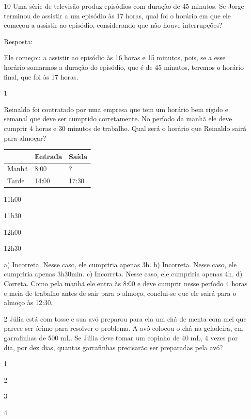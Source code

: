 \begin{escolha}
\num{10} Uma série de televisão produz episódios com duração de 45 minutos.
Se Jorge terminou de assistir a um episódio às 17 horas, qual foi o
horário em que ele começou a assistir ao episódio, considerando que não houve interrupções?


Resposta:

Ele começou a assistir ao episódio às 16 horas e 15 minutos, pois, se a esse
horário somarmos a duração do episódio, que é de 45 minutos, teremos o
horário final, que foi às 17 horas.


\num{1}

Reinaldo foi contratado por uma empresa que tem um horário bem rígido
e semanal que deve ser cumprido corretamente. No período da manhã ele deve
cumprir 4 horas e 30 minutos de trabalho. Qual será o horário que
Reinaldo sairá para almoçar?

\begin{longtable}[]{@{}lll@{}}
\toprule
& Entrada & Saída\tabularnewline
\midrule
\endhead
Manhã & 8:00 & ?\tabularnewline
Tarde & 14:00 & 17:30\tabularnewline
\bottomrule
\end{longtable}

\begin{escolha}
\item
  11h00
\item
  11h30
\item
  12h00
\item
  12h30
\end{escolha}

a) Incorreta. Nesse caso, ele cumpriria apenas 3h.
b) Incorreta. Nesse caso, ele cumpriria apenas 3h30min.
c) Incorreta. Nesse caso, ele cumpriria apenas 4h.
d) Correta. Como pela manhã ele entra às 8:00 e deve cumprir nesse período 4 horas e
meia de trabalho antes de sair para o almoço, conclui-se que ele sairá para o almoço às 12:30.

\num{2} Júlia está com tosse e sua avó preparou para ela um chá de menta com mel que parece ser órimo para resolver o problema. A avó colocou o chá na geladeira, em garrafinhas de 500 mL. Se Júlia deve tomar um copinho de 40 mL, 4 vezes por dia, por dez dias, quantas garrafinhas precisarão ser preparadas pela avó?

\begin{escolha}

\item
  1
\item
  2
\item
  3
\item
  4
\end{escolha}


\end{escolha}
